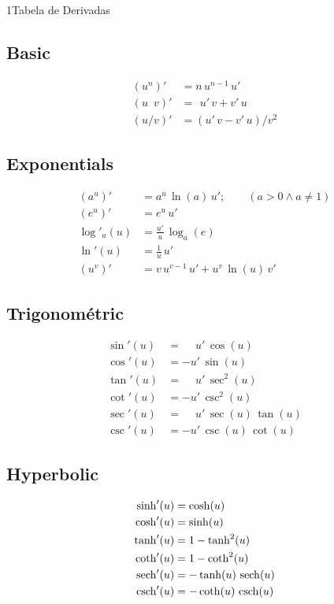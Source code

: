 \documentclass["AM3C-Slides_annotations.tex"]{subfiles}
\begin{document}
\begin{sectionBox}1{Tabela de Derivadas} %
  \begin{multicols}{2}

    \subsection*{Basic}
    \begin{align}
        \left(u^n\right)'     &= n\,u^{n-1}\,u'
      \\ \left(u\phantom{/}v\right)' &= \phantom{(}u'\,v + v'\,u
      \\ \left(u/v\right)'    &=   \left(  u'\,v - v'\,u\right)/v^2
    \end{align}

    \subsection*{Exponentials}
    \begin{align}
         \left(a^u\right)'&= a^u\,\ln(a)\,u'; \qquad (a>0 \land a\neq1) 
      \\ \left(e^u\right)'&= e^u\,u' 
      \\ \log'_{a} (u)    &= \frac{u'}{u}\,\log_{a}(e) 
      \\ \ln'(u)          &= \frac{1}{u}\,u' 
      \\ (u^v)'           &= v\,u^{v-1}\,u' + u^v\,\ln(u)\,v' 
    \end{align}

    \subsection*{Trigonométric}
    \begin{align}
         \sin'(u)&= \phantom{-}u'\,\cos(u) 
      \\ \cos'(u)&=   - u'\,\sin(u) 
      \\ \tan'(u)&= \phantom{-}u'\,\sec^2(u) 
      \\ \cot'(u)&=   - u'\,\csc^2(u) 
      \\ \sec'(u)&= \phantom{-}u'\,\sec(u)\,\tan(u) 
      \\ \csc'(u)&=   - u'\,\csc(u)\,\cot(u) 
    \end{align}

    \subsection*{Hyperbolic}
    \begin{align}
        \sinh'(u)&= \cosh(u) 
      \\ \cosh'(u)&= \sinh(u) 
      \\ \tanh'(u)&= 1-\tanh^2(u) 
      \\ \coth'(u)&= 1-\coth^2(u) 
      \\ \operatorname{sech}'(u)&= -\tanh(u)\,\operatorname{sech}(u) 
      \\ \operatorname{csch}'(u)&= -\coth(u)\,\operatorname{csch}(u) 
    \end{align}


\end{multicols}
\end{sectionBox}
\end{document}
